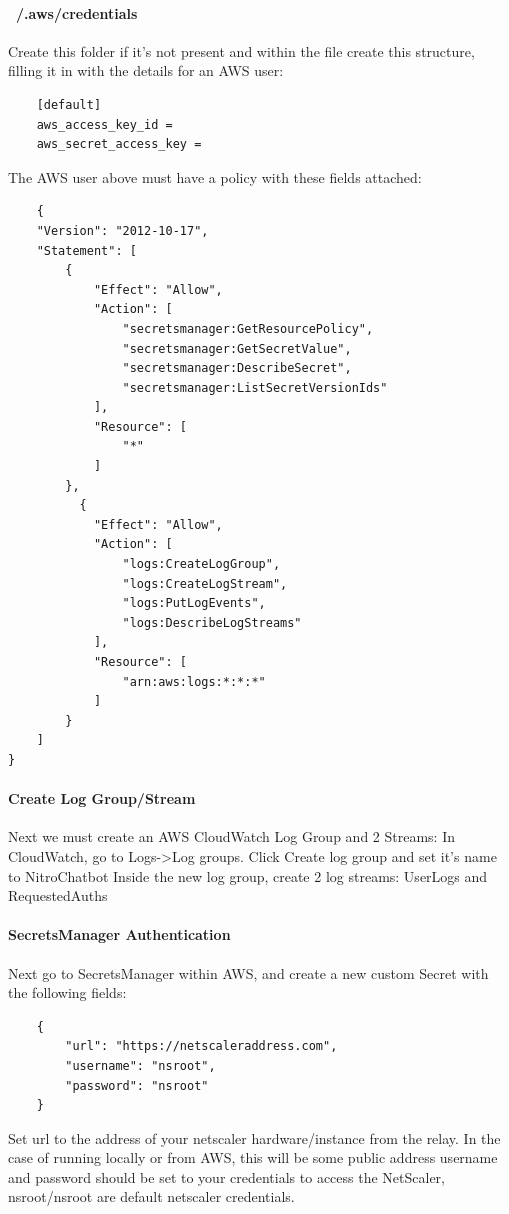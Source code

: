 \documentclass[onecolumn, draftclsnofoot,10pt, compsoc]{IEEEtran}
\begin{document}
\paragraph{~/.aws/credentials}
Create this folder if it's not present and within the file create this structure, filling it in with the details for an AWS user:
\begin{verbatim}
    [default]
    aws_access_key_id = 
    aws_secret_access_key =
\end{verbatim}

The AWS user above must have a policy with these fields attached:
\begin{verbatim}
    {
    "Version": "2012-10-17",
    "Statement": [
        {
            "Effect": "Allow",
            "Action": [
                "secretsmanager:GetResourcePolicy",
                "secretsmanager:GetSecretValue",
                "secretsmanager:DescribeSecret",
                "secretsmanager:ListSecretVersionIds"
            ],
            "Resource": [
                "*"
            ]
        },
	      {
            "Effect": "Allow",
            "Action": [
                "logs:CreateLogGroup",
                "logs:CreateLogStream",
                "logs:PutLogEvents",
                "logs:DescribeLogStreams"
            ],
            "Resource": [
                "arn:aws:logs:*:*:*"
            ]
        }
    ]
}
\end{verbatim}

\paragraph{Create Log Group/Stream}
Next we must create an AWS CloudWatch Log Group and 2 Streams: In CloudWatch, go to Logs->Log groups.
Click Create log group and set it's name to NitroChatbot Inside the new log group, create 2 log streams: UserLogs and RequestedAuths

\paragraph{SecretsManager Authentication}
Next go to SecretsManager within AWS, and create a new custom Secret with the following fields:
\begin{verbatim}
    {
        "url": "https://netscaleraddress.com",
        "username": "nsroot",
        "password": "nsroot"
    }
\end{verbatim}

Set url to the address of your netscaler hardware/instance from the relay.
In the case of running locally or from AWS, this will be some public address username and password should be set to your credentials to access the NetScaler, nsroot/nsroot are default netscaler credentials.
\end{document}
